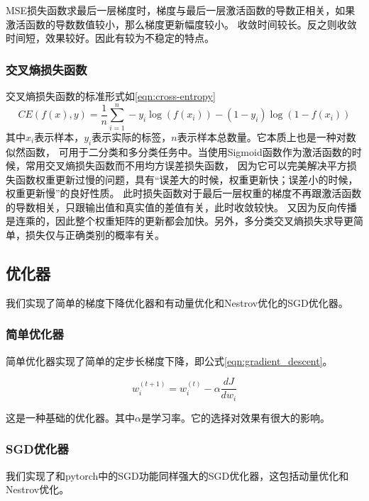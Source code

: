 \documentclass[a4paper,twoside,twocolumn]{article}
\begin{document}
\begin{spacing}{1.2}
MSE损失函数求最后一层梯度时，梯度与最后一层激活函数的导数正相关，如果激活函数的导数数值较小，那么梯度更新幅度较小。
收敛时间较长。反之则收敛时间短，效果较好。因此有较为不稳定的特点。

\subsubsection{交叉熵损失函数}

交叉熵损失函数的标准形式如\eqref{eqn:cross-entropy}
\begin{equation}
	\label{eqn:cross-entropy}
	CE(f(x), y) = \frac{1}{n} \sum_{i=1}^n -y_i \log(f(x_i)) - (1-y_i) \log(1-f(x_i))
\end{equation}
其中$x_i$表示样本，$y_i$表示实际的标签，$n$表示样本总数量。它本质上也是一种对数似然函数，
可用于二分类和多分类任务中。当使用Sigmoid函数作为激活函数的时候，常用交叉熵损失函数而不用均方误差损失函数，
因为它可以完美解决平方损失函数权重更新过慢的问题，具有“误差大的时候，权重更新快；误差小的时候，权重更新慢”的良好性质。
此时损失函数对于最后⼀层权重的梯度不再跟激活函数的导数相关，只跟输出值和真实值的差值有关，此时收敛较快。
⼜因为反向传播是连乘的，因此整个权重矩阵的更新都会加快。另外，多分类交叉熵损失求导更简单，损失仅与正确类别的概率有关。


\subsection{优化器}

我们实现了简单的梯度下降优化器和有动量优化和Nestrov优化的SGD优化器。

\subsubsection{简单优化器}

简单优化器实现了简单的定步长梯度下降，即公式\eqref{eqn:gradient_descent}。

\begin{equation}
	\label{eqn:gradient_descent}
	w_i^{(t+1)} = w_i^{(t)} - \alpha \frac{dJ}{dw_i}
\end{equation}

这是一种基础的优化器。其中$\alpha$是学习率。它的选择对效果有很大的影响。

\subsubsection{SGD优化器}
我们实现了和pytorch中的SGD功能同样强大的SGD优化器，这包括动量优化和Nestrov优化。


\end{spacing}
\end{document}

